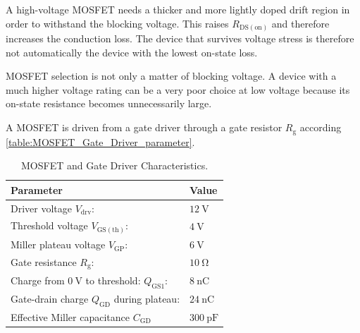 
\begin{solutionblock}
    A high-voltage MOSFET needs a thicker and more lightly doped drift region in order to withstand the blocking voltage.
    This raises $R_\mathrm{DS(on)}$ and therefore increases the conduction loss. 
    The device that survives voltage stress is therefore not automatically the device with the lowest on-state loss.
\end{solutionblock}


\begin{solutionblock}
    MOSFET selection is not only a matter of blocking voltage. 
    A device with a much higher voltage rating can be a very poor choice at low voltage because its on-state resistance becomes unnecessarily large.
\end{solutionblock}




A MOSFET is driven from a gate driver through a gate resistor $R_\mathrm{g}$ according \autoref{table:MOSFET_Gate_Driver_parameter}.

\begin{table}[ht]
    \centering
    \begin{tabular}{ll}
        \toprule
        Parameter & Value\\
        \midrule
        Driver voltage $V_\mathrm{drv}:$ & $\SI{12}{\volt}$\\
        Threshold voltage $V_\mathrm{GS(th)}:$ & $\SI{4}{\volt}$\\
        Miller plateau voltage $V_\mathrm{GP}:$ & $\SI{6}{\volt}$\\
        Gate resistance $R_\mathrm{g}:$ & $\SI{10}{\ohm}$\\
        Charge from $\SI{0}{\volt}$ to threshold: $Q_\mathrm{GS1}:$ & $\SI{8}{\nano\coulomb}$\\
        Gate-drain charge  $Q_\mathrm{GD}$ during plateau: & $\SI{24}{\nano\coulomb}$\\
        Effective Miller capacitance $C_\mathrm{GD}$ & $\SI{300}{\pico\farad}$\\
        \bottomrule
    \end{tabular}
    \caption{MOSFET and Gate Driver Characteristics.}
    \label{table:MOSFET_Gate_Driver_parameter}
\end{table}

